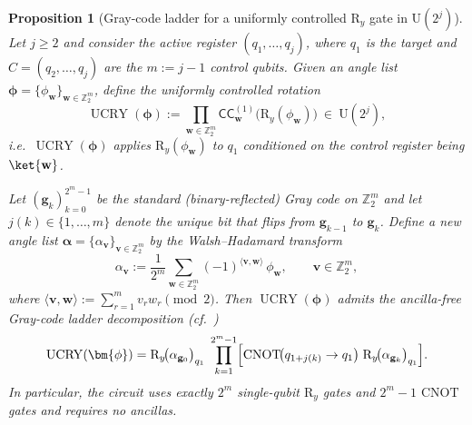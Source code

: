 \documentclass{article}
\DeclareMathOperator{\UCRY}{UCRY}
\newtheorem{proposition}[theorem]{Proposition}
\newcommand{\CC}{\mathsf{C}\mathsf{C}}
\newcommand{\RY}{\mathrm{R}_y}
\newcommand{\CNOT}{\mathrm{CNOT}}
\numberwithin{equation}{section}
\begin{document}
\begin{proposition}[Gray-code ladder for a uniformly controlled $\RY$ gate in $\mathrm{U}(2^j)$]
\label{prop:ucr_gray_ladder}
Let $j\ge 2$ and consider the active register $(q_1,\dots,q_j)$, where $q_1$ is the target and
$C=(q_2,\dots,q_j)$ are the $m:=j-1$ control qubits.
Given an angle list $\bm{\phi}=\{\phi_{\mathbf{w}}\}_{\mathbf{w}\in\mathbb{Z}_2^{m}}$, define the uniformly controlled rotation
\begin{equation}\label{eq:ucr_def}
\UCRY(\bm{\phi})
:=\prod_{\mathbf{w}\in\mathbb{Z}_2^{m}} \CC_{\mathbf{w}}^{(1)}\!\bigl(\RY(\phi_{\mathbf{w}})\bigr)\ \in\ \mathrm{U}(2^j),
\end{equation}
i.e.\ $\UCRY(\bm{\phi})$ applies $\RY(\phi_{\mathbf{w}})$ to $q_1$ conditioned on the control register being $\ket{\mathbf{w}}$.

Let $(\mathbf{g}_k)_{k=0}^{2^{m}-1}$ be the standard (binary-reflected) Gray code on $\mathbb{Z}_2^m$ and let
$j(k)\in\{1,\dots,m\}$ denote the unique bit that flips from $\mathbf{g}_{k-1}$ to $\mathbf{g}_k$.
Define a new angle list $\bm{\alpha}=\{\alpha_{\mathbf{v}}\}_{\mathbf{v}\in\mathbb{Z}_2^{m}}$ by the Walsh--Hadamard transform
\begin{equation}\label{eq:alpha_from_phi}
\alpha_{\mathbf{v}}
:=\frac{1}{2^{m}}\sum_{\mathbf{w}\in\mathbb{Z}_2^{m}}(-1)^{\langle \mathbf{v},\mathbf{w}\rangle}\,\phi_{\mathbf{w}},
\qquad \mathbf{v}\in\mathbb{Z}_2^{m},
\end{equation}
where $\langle \mathbf{v},\mathbf{w}\rangle:=\sum_{r=1}^{m} v_r w_r \pmod 2$.
Then $\UCRY(\bm{\phi})$ admits the ancilla-free Gray-code ladder decomposition (cf.~\cite{Bergholm2005})
\begin{equation}\label{eq:ucr_ladder}
\UCRY(\bm{\phi})
=
\RY\!\bigl(\alpha_{\mathbf{g}_0}\bigr)_{q_1}\;
\prod_{k=1}^{2^{m}-1}
\Bigl[\CNOT\!\bigl(q_{1+j(k)}\to q_1\bigr)\;\RY\!\bigl(\alpha_{\mathbf{g}_k}\bigr)_{q_1}\Bigr].
\end{equation}
In particular, the circuit uses exactly $2^{m}$ single-qubit $\RY$ gates and $2^{m}-1$ $\CNOT$ gates and requires no ancillas.
\end{proposition}
\end{document}
